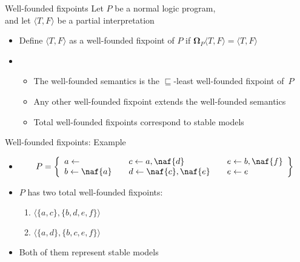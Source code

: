 \begin{frame}{Well-founded fixpoints}
  \bigskip
  Let $P$ be a normal logic program,\\ and
  let $\langle T,F \rangle$ be a partial interpretation
  \medskip
  \begin{itemize}
  \item<1-> Define
    $\langle T,F \rangle$ as a \alert{well-founded fixpoint} of $P$
    if
    ${\mathbf{\Omega}}_P\langle T,F \rangle = \langle T,F \rangle$
  \medskip
  \item<2-> []
    \begin{itemize}
    \item The well-founded semantics is the $\sqsubseteq$-least well-founded
      fixpoint of~$P$
    \item Any other well-founded fixpoint extends the well-founded semantics
    \item Total well-founded fixpoints correspond to stable models
    \end{itemize}
  \end{itemize}
\end{frame}
\begin{frame}{Well-founded fixpoints: Example}
  \bigskip
  \begin{itemize}
  \item<1-> []
    \[
    P
    =
    \left\{
      \begin{array}{lll}
        a \leftarrow                  \quad &
        c \leftarrow a, \naf{d}       \quad &
        e \leftarrow b, \naf{f}
        \\
        b \leftarrow \naf{a}          \quad &
        d \leftarrow \naf{c}, \naf{e} \quad &
        e \leftarrow e
      \end{array}
    \right\}
    \]
    \bigskip
  \item<2-> $P$ has two total well-founded fixpoints:
    \begin{enumerate}
    \item<3-> $\langle \{a,c\}, \{b,d,e,f\} \rangle$
    \item<3-> $\langle \{a,d\}, \{b,c,e,f\} \rangle$
    \end{enumerate}
    \medskip
  \item <4-> Both of them represent stable models
  \end{itemize}
\end{frame}
